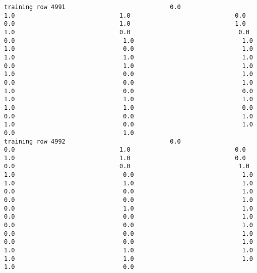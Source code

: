 \documentclass[11pt]{article}
\begin{document}
\begin{verbatim}
training row 4991                             0.0                             1.0                             1.0                             0.0                             0.0                             1.0                             1.0                             1.0                             0.0                              0.0                              0.0                              1.0                              1.0                              1.0                              0.0                              1.0                              1.0                              1.0                              1.0                              0.0                              1.0                              1.0                              1.0                              0.0                              1.0                              0.0                              0.0                              1.0                              1.0                              0.0                              0.0                              1.0                              1.0                              1.0                              1.0                              1.0                              0.0                              0.0                              0.0                              1.0                              1.0                              0.0                              1.0                              0.0                              1.0
training row 4992                             0.0                             0.0                             1.0                             0.0                             1.0                             1.0                             0.0                             0.0                             0.0                              1.0                              1.0                              0.0                              1.0                              1.0                              1.0                              1.0                              0.0                              0.0                              1.0                              0.0                              0.0                              1.0                              0.0                              1.0                              1.0                              0.0                              0.0                              1.0                              0.0                              0.0                              1.0                              0.0                              0.0                              1.0                              0.0                              0.0                              1.0                              1.0                              1.0                              1.0                              1.0                              1.0                              1.0                              1.0                              0.0

\end{verbatim}
\end{document}
